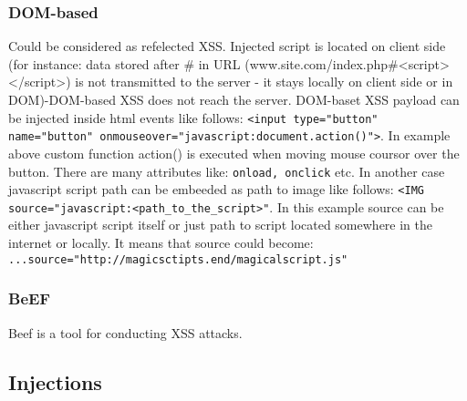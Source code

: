 \documentclass{article}[12pt]
\begin{document}
\subsubsection{DOM-based} Could be considered as refelected XSS. Injected script is located on client side (for instance: data stored after \# in URL (www.site.com/index.php\#<script></script>) is not transmitted to the server - it stays locally on client side or in DOM)-DOM-based XSS does not reach the server.
DOM-baset XSS payload can be injected inside html events like follows: \texttt{<input type="button" name="button" onmouseover="javascript:document.action()">}. In example above custom function action() is executed when moving mouse coursor over the button. There are many attributes like: \texttt{onload, onclick} etc. In another case javascript script path can be embeeded as path to image like follows:
\texttt{<IMG source="javascript:<path\_to\_the\_script>"}. In this example source can be either javascript script itself or just path to script located somewhere in the internet or locally. It means that source could become:
\texttt{...source="http://magicsctipts.end/magicalscript.js"}

\subsubsection{BeEF} Beef is a tool for conducting XSS attacks.




\subsection{Injections}
\end{document}
